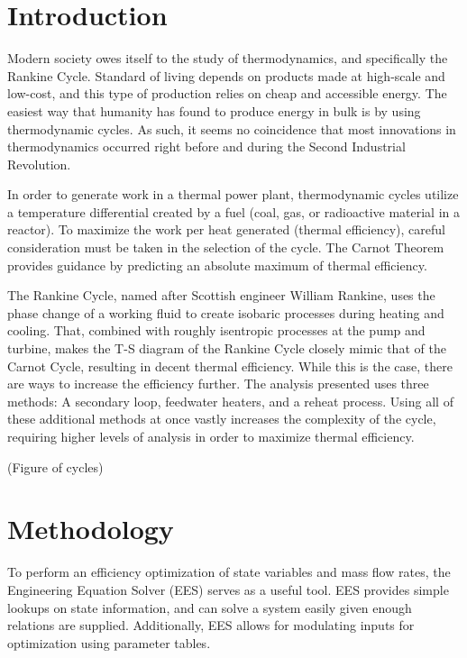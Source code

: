\documentclass[10pt,cleanfoot]{asme2ej}
\begin{document}
\section{Introduction}

Modern society owes itself to the study of thermodynamics, and specifically the Rankine Cycle. Standard of living depends on products made at high-scale and low-cost, and this type of production relies on cheap and accessible energy. The easiest way that humanity has found to produce energy in bulk is by using thermodynamic cycles. As such, it seems no coincidence that most innovations in thermodynamics occurred right before and during the Second Industrial Revolution.

In order to generate work in a thermal power plant, thermodynamic cycles utilize a temperature differential created by a fuel (coal, gas, or radioactive material in a reactor). To maximize the work per heat generated (thermal efficiency), careful consideration must be taken in the selection of the cycle. The Carnot Theorem provides guidance by predicting an absolute maximum of thermal efficiency.

The Rankine Cycle, named after Scottish engineer William Rankine, uses the phase change of a working fluid to create isobaric processes during heating and cooling. That, combined with roughly isentropic processes at the pump and turbine, makes the T-S diagram of the Rankine Cycle closely mimic that of the Carnot Cycle, resulting in decent thermal efficiency. While this is the case, there are ways to increase the efficiency further. The analysis presented uses three methods: A secondary loop, feedwater heaters, and a reheat process. Using all of these additional methods at once vastly increases the complexity of the cycle, requiring higher levels of analysis in order to maximize thermal efficiency.

(Figure of cycles)

\section{Methodology}

To perform an efficiency optimization of state variables and mass flow rates, the Engineering Equation Solver (EES) serves as a useful tool. EES provides simple lookups on state information, and can solve a system easily given enough relations are supplied. Additionally, EES allows for modulating inputs for optimization using parameter tables.
\end{document}
